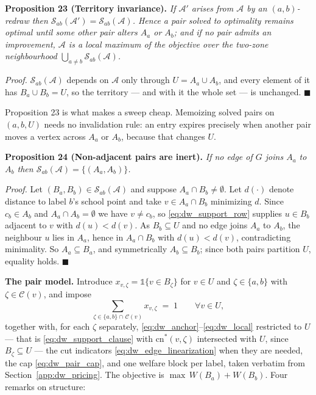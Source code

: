 \documentclass{article}
\begin{document}
\noindent\textbf{Proposition 23 (Territory invariance).} \textit{If
$\mathcal A'$ arises from $\mathcal A$ by an $(a,b)$-redraw then
$\mathcal S_{ab}(\mathcal A') = \mathcal S_{ab}(\mathcal A)$. Hence a pair
solved to optimality remains optimal until some other pair alters $A_a$ or
$A_b$; and if no pair admits an improvement, $\mathcal A$ is a local maximum of
the objective over the two-zone neighbourhood
$\bigcup_{a \neq b}\mathcal S_{ab}(\mathcal A)$.}

\textit{Proof.} $\mathcal S_{ab}(\mathcal A)$ depends on $\mathcal A$ only
through $U = A_a \cup A_b$, and every element of it has $B_a \cup B_b = U$, so
the territory --- and with it the whole set --- is unchanged. $\blacksquare$

Proposition 23 is what makes a sweep cheap. Memoizing solved pairs on
$(a, b, U)$ needs no invalidation rule: an entry expires precisely when another
pair moves a vertex across $A_a$ or $A_b$, because that changes $U$.

\noindent\textbf{Proposition 24 (Non-adjacent pairs are inert).} \textit{If no
edge of $G$ joins $A_a$ to $A_b$ then
$\mathcal S_{ab}(\mathcal A) = \{(A_a, A_b)\}$.}

\textit{Proof.} Let $(B_a, B_b) \in \mathcal S_{ab}(\mathcal A)$ and suppose
$A_a \cap B_b \neq \emptyset$. Let $d(\cdot)$ denote distance to label $b$'s
school point and take $v \in A_a \cap B_b$ minimizing $d$. Since $c_b \in A_b$
and $A_a \cap A_b = \emptyset$ we have $v \neq c_b$, so
\eqref{eq:dw_support_row} supplies $u \in B_b$ adjacent to $v$ with
$d(u) < d(v)$. As $B_b \subseteq U$ and no edge joins $A_a$ to $A_b$, the
neighbour $u$ lies in $A_a$, hence in $A_a \cap B_b$ with $d(u) < d(v)$,
contradicting minimality. So $A_a \subseteq B_a$, and symmetrically
$A_b \subseteq B_b$; since both pairs partition $U$, equality holds.
$\blacksquare$

\noindent\textbf{The pair model.} Introduce
$x_{v, \zeta} = \mathds{1}\{v \in B_\zeta\}$ for $v \in U$ and
$\zeta \in \{a, b\}$ with $\zeta \in \mathcal C(v)$, and impose
\begin{equation}\label{eq:dw_pair_exactly_one}
\sum_{\zeta \in \{a,b\} \cap\, \mathcal C(v)} x_{v,\zeta} \;=\; 1
\qquad \forall v \in U ,
\end{equation}
together with, for each $\zeta$ separately,
\eqref{eq:dw_anchor}--\eqref{eq:dw_local} restricted to $U$ --- that is
\eqref{eq:dw_support_clause} with $\text{cn}^{*}(v, \zeta)$ intersected with
$U$, since $B_\zeta \subseteq U$ --- the cut indicators
\eqref{eq:dw_edge_linearization} when they are needed, the cap
\eqref{eq:dw_pair_cap}, and one welfare block per label, taken verbatim from
Section~\ref{app:dw_pricing}. The objective is
$\max\, W(B_a) + W(B_b)$. Four remarks on structure:
\end{document}
